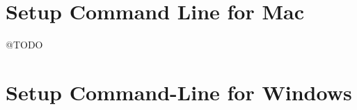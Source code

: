 \section{Setup Command Line for Mac}\label{sec:setup-command-line-for-mac}
@TODO


\section{Setup Command-Line for Windows}\label{sec:setup-command-line-for-windows}

